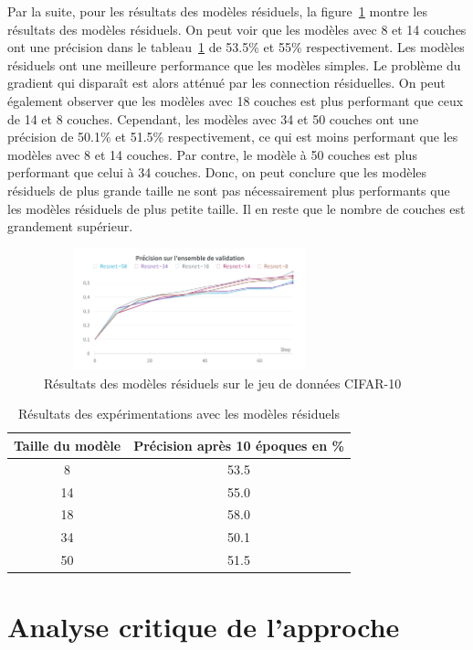 \documentclass{article}
\begin{document}
Par la suite, pour les résultats des modèles résiduels, la figure~\ref{fig:result_resnet} montre les résultats des modèles résiduels.
On peut voir que les modèles avec 8 et 14 couches ont une précision dans le tableau~\ref{tab:result_resnet} de 53.5\% et 55\% respectivement.
Les modèles résiduels ont une meilleure performance que les modèles simples. Le problème du gradient qui disparaît est alors atténué par les 
connection résiduelles.
On peut également observer que les modèles avec 18 couches est plus performant que ceux de 14 et 8 couches.
Cependant, les modèles avec 34 et 50 couches ont une précision de 50.1\% et 51.5\% respectivement, ce qui est moins performant
que les modèles avec 8 et 14 couches. Par contre, le modèle à 50 couches est plus performant que celui à 34 couches. Donc, on peut
conclure que les modèles résiduels de plus grande taille
ne sont pas nécessairement plus performants que les modèles résiduels de plus petite taille.
Il en reste que le nombre de couches est grandement supérieur.

\begin{figure}[h]
    \centering
    \includegraphics[width=240pt,height=100pt]{./img/result_resnet.png}
    \caption{Résultats des modèles résiduels sur le jeu de données CIFAR-10}\label{fig:result_resnet}
\end{figure}

\begin{table}[H]
    \centering
    \begin{tabular}{cc}
    \hline
    Taille du modèle & Précision après 10 époques en \% \\
    \hline
    8 & 53.5 \\
    14 & 55.0 \\
    18 & 58.0 \\
    34 & 50.1 \\
    50 & 51.5 \\
    \hline
    \end{tabular}
    \caption{Résultats des expérimentations avec les modèles résiduels}\label{tab:result_resnet}
\end{table}

\section{Analyse critique de l'approche}
\end{document}
